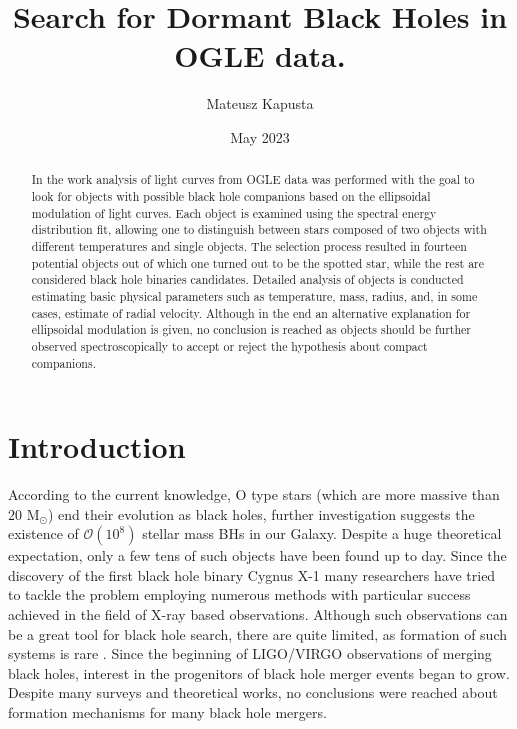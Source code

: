 \documentclass{pracalicmgr}
\author{Mateusz Kapusta}
\title{Search for Dormant Black Holes in OGLE data.}
\date{May 2023}
\begin{document}
    \maketitle
    \let\cleardoublepage\clearpage
\begin{abstract}
    In the work analysis of light curves from OGLE data was performed with the goal to look for objects with possible black hole companions 
    based on the ellipsoidal modulation of light curves. Each object is examined using the spectral energy distribution fit, allowing one to distinguish
    between stars composed of two objects with different temperatures and single objects. The selection process resulted in fourteen
    potential objects out of which one turned out to be the spotted star, while the rest are considered black hole binaries candidates.
    Detailed analysis of objects is conducted estimating basic physical parameters such as temperature, mass, radius,
    and, in some cases, estimate of radial velocity. Although in the end an alternative explanation for ellipsoidal modulation is given, 
    no conclusion is reached as objects should be further observed spectroscopically to accept or reject the hypothesis about compact companions.
\end{abstract}

\tableofcontents

\chapter{Introduction}
According to the current knowledge, O type stars (which are more massive than $20$ M$_\odot$) end their evolution as black holes, further investigation suggests
the existence of $\mathcal{O}(10^8)$ stellar mass BHs \citep{brown_scenario_1994} in our Galaxy.
Despite a huge theoretical expectation, only a few tens of such objects have been found up to day.
Since the discovery of the first black hole binary Cygnus X-1 many researchers have tried to tackle the problem employing numerous methods with particular
success achieved in the field of X-ray based observations. Although such observations can be a great tool for black hole search, there are quite limited,
as formation of such systems is rare \citep{zwart_formation_1997}. Since the beginning of LIGO/VIRGO observations of merging black holes,
interest in the progenitors of black hole merger events began to grow. Despite many surveys and theoretical works, 
no conclusions were reached about formation mechanisms for many black hole mergers. 
\end{document}
